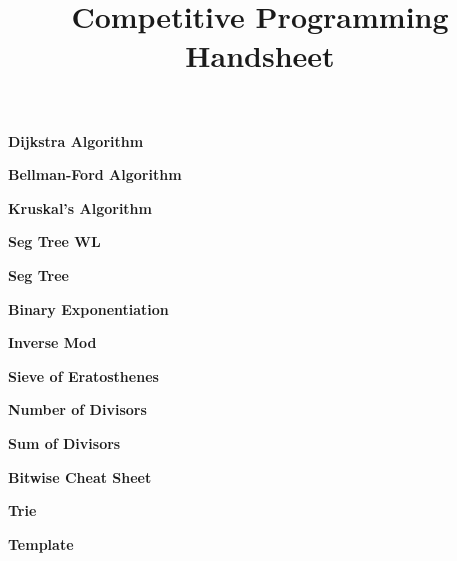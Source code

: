 \documentclass[10pt,a4paper]{article}
\title{\vspace{-2em}Competitive Programming Handsheet\vspace{-1em}}
\date{}
\newcommand{\includecode}[4]{
    \noindent\textbf{#2}\par
    
    \vspace{0.3em}
}
\begin{document}
\maketitle
\vspace{-1.5em}

\begin{multicols}{3}
\includecode{dijkstra}{Dijkstra Algorithm}{C++}{Graph algorithms/Dijkstra.cpp}
\includecode{bellmanford}{Bellman-Ford Algorithm}{C++}{Graph algorithms/BellmanFord.cpp}
\includecode{kruskal}{Kruskal's Algorithm}{C++}{Graph algorithms/Kruskal's Algorithm.cpp}
\includecode{segwl}{Seg Tree WL}{C++}{Graph algorithms/Segment Tree Without Lazy.cpp}
\includecode{seg}{Seg Tree}{C++}{message.cpp}


\includecode{binary_exponentiation}{Binary Exponentiation}{C++}{Number theory/Binary Exponentiation.cpp}
\includecode{invMod}{Inverse Mod}{C++}{Number theory/Inverse Mod.cpp}
\includecode{sieve}{Sieve of Eratosthenes}{C++}{Number theory/Sieve of Eratosthenes.cpp}
\includecode{NumOfDivisors}{Number of Divisors}{C++}{Number theory/Number of Divisors.cpp}
\includecode{SumOfDivisors}{Sum of Divisors}{C++}{Number theory/Sum of Divisors.cpp}

\includecode{bitwise}{Bitwise Cheat Sheet}{C++}{Bitwise/bitwiseCheatsheet.cpp}

\includecode{trie}{Trie}{C++}{TRIE.cpp}
\includecode{template}{Template}{C++}{template.cpp}



\end{multicols}
\end{document}
